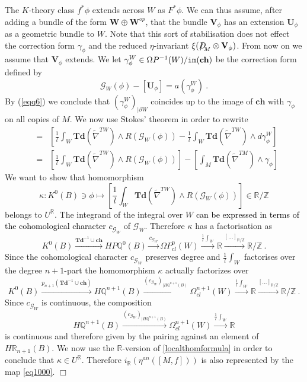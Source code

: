 \documentclass[12pt]{article}
\newcommand{\bW}{{\mathbf{W}}}
\newcommand{\im}{{\tt im}}
\newcommand{\cG}{{\mathcal{G}}}
\def\hB{\hspace*{\fill}$\Box$ \newline\noindent}
\newcommand{\Z}{{\mathbb{Z}}}
\newcommand{\Q}{{\mathbb{Q}}}
\newcommand{\R}{{\mathbb{R}}}
\newcommand{\Hom}{{\tt Hom}}
\newcommand{\Td}{{\mathbf{Td}}}
\newcommand{\ch}{{\mathbf{ch}}}
\newcommand{\bV}{{\mathbf{V}}}
\newcommand{\bU}{{\mathbf{U}}}
\newcommand{\Dirac}{{D\hspace{-0.27cm}/}}
\begin{document}
The $K$-theory class $f^{*}\phi$ extends across $W$ as $F^{*}\phi$.
We can thus assume, after adding a bundle of the form $\bW\oplus \bW^{op}$,  that the bundle $\bV_{\phi}$ has an extension $\bU_{\phi}$ as a geometric bundle to $W$. Note that this sort of stabilisation does not
effect the correction form $\gamma_{\phi}$ and the reduced $\eta$-invariant
$\xi(\Dirac_{M}\otimes \bV_{\phi})$. From now on we assume that $\bV_{\phi}$ extends.
We let $\gamma^{W}_{\phi}\in \Omega P^{-1}(W)/\im(\ch)$ be the correction form defined by 
$$\cG_{W}(\phi)-[\bU_{\phi}]=a(\gamma_{\phi}^{W})\ .$$
By (\ref{eqq6}) we conclude that $(\gamma^{W}_{\phi})_{|\partial W}$ coincides up to the image of $\ch$ with $\gamma_{\phi}$ on all copies of $M$. We now use Stokes' theorem    in order to rewrite
\begin{eqnarray*}
[\frac{1}{l}\int_{W}\Td(\tilde \nabla^{TW})\wedge \ch(\nabla^{U_{\phi}})] &=& [
\frac{1}{l}\int_{W} \Td(\tilde \nabla^{TW})\wedge R(\cG_{W}(\phi)) - \frac{1}{l}\int_{W} \Td(\tilde \nabla^{TW})\wedge d\gamma^{W}_{\phi}]          \\
&=&[\frac{1}{l}\int_{W} \Td(\tilde \nabla^{TW})\wedge R(\cG_{W}(\phi))]-[\int_{M} \Td(\tilde \nabla^{TM})\wedge \gamma_{\phi}] \end{eqnarray*}
  We want to show that  homomorphism
 $$\kappa:K^{0}(B)\ni \phi\mapsto [\frac{1}{l}\int_{W} \Td(\tilde \nabla^{TW})\wedge R(\cG_{W}(\phi))]\in \R/\Z$$ belongs to $U^{\R}$. The integrand of the integral over $W$ \textcolor{black}{can be expressed in terms of the cohomological character $c_{\cG_{W}}$} of $\cG_{W}$. Therefore $\kappa$ has 
    a factorisation as
 $$K^{0}(B)\xrightarrow{ \Td^{-1}\cup\ch} HP\Q^{0}(B)\xrightarrow{c_{\cG_{W}}} \Omega P^{0}_{cl}(W)\xrightarrow{\frac{1}{l}\int_{W}}\R\xrightarrow{[\dots]_{\R/\Z}} \R/\Z\ .$$
Since the cohomological character $c_{\cG_{W}}$ preserves degree and $\frac{1}{l}\int_{W}$ factorises over the degree $n+1$-part the homomorphism $\kappa$ actually factorizes over 
$$K^{0}(B)\xrightarrow{ p_{n+1}(\Td^{-1}\cup\ch)} H\Q^{n+1}(B)\xrightarrow{(c_{\cG_{W}})_{|H\Q^{n+1}(B)}} \Omega_{cl}^{n+1}(W)\xrightarrow{\frac{1}{l}\int_{W}}\R\xrightarrow{[\dots]_{\R/\Z}} \R/\Z\ .$$
Since $c_{\cG_{W}}$ is continuous,  the composition
$$H\Q^{n+1}(B)\xrightarrow{(c_{\cG_{W}})_{|H\Q^{n+1}(B)}} \Omega^{n+1}_{cl}(W)\xrightarrow{\frac{1}{l}\int_{W}}\R$$
is continuous and therefore given by the pairing against an element of $H\R_{n+1}(B)$. 
We now use  the $\R$-version of   \eqref{localthomformula} in order to conclude that $\kappa\in U^{\R}$.
 Therefore
 $i_{\R}(\eta^{an}([M,f]))$ is also represented by 
 the map \eqref{eq1000}. \hB
 
\end{document}

